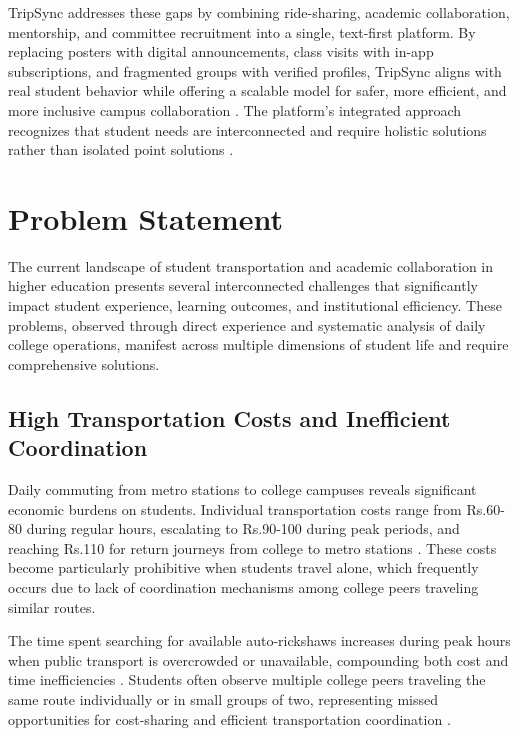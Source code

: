 \documentclass[conference]{IEEEtran}
\begin{document}
TripSync addresses these gaps by combining ride-sharing, academic collaboration, mentorship, and committee recruitment into a single, text-first platform. By replacing posters with digital announcements, class visits with in-app subscriptions, and fragmented groups with verified profiles, TripSync aligns with real student behavior while offering a scalable model for safer, more efficient, and more inclusive campus collaboration \cite{ref4}\cite{ref5}. The platform's integrated approach recognizes that student needs are interconnected and require holistic solutions rather than isolated point solutions \cite{ref6}\cite{ref7}.

\section{Problem Statement}

The current landscape of student transportation and academic collaboration in higher education presents several interconnected challenges that significantly impact student experience, learning outcomes, and institutional efficiency. These problems, observed through direct experience and systematic analysis of daily college operations, manifest across multiple dimensions of student life and require comprehensive solutions.

\subsection{High Transportation Costs and Inefficient Coordination}

Daily commuting from metro stations to college campuses reveals significant economic burdens on students. Individual transportation costs range from Rs.60-80 during regular hours, escalating to Rs.90-100 during peak periods, and reaching Rs.110 for return journeys from college to metro stations \cite{ref8}\cite{ref9}. These costs become particularly prohibitive when students travel alone, which frequently occurs due to lack of coordination mechanisms among college peers traveling similar routes.

The time spent searching for available auto-rickshaws increases during peak hours when public transport is overcrowded or unavailable, compounding both cost and time inefficiencies \cite{ref10}\cite{ref11}. Students often observe multiple college peers traveling the same route individually or in small groups of two, representing missed opportunities for cost-sharing and efficient transportation coordination \cite{ref12}\cite{ref13}.
\end{document}
